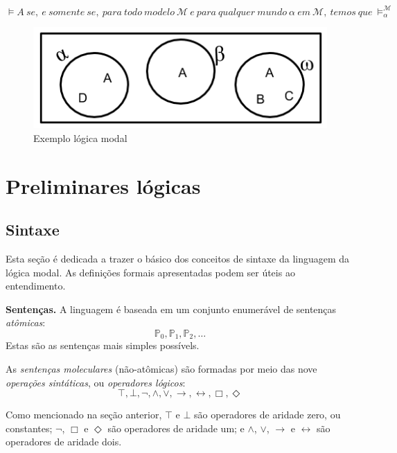 \begin{equation}
    \models A\ se,\ e\ somente\ se,\ para\ todo\ modelo\ \mathcal{M}\ e\ para\ 
    qualquer\ mundo\ \alpha\ em\ \mathcal{M},\ temos\ que\ \models ^{\mathcal{M}}_\alpha 
\end{equation}



\begin{figure}
\label{figure:mundos_simples}
\begin{center}
\includegraphics[scale=0.8]{imagens/ex_modal_simples.png}
\caption{Exemplo lógica modal}
\end{center}
\end{figure}

\section{Preliminares lógicas}
\subsection{Sintaxe}

Esta seção é dedicada a trazer o básico dos conceitos de sintaxe da linguagem da
lógica modal. As definições formais apresentadas podem ser úteis ao
entendimento.

\textbf{Sentenças.} A linguagem é baseada em um conjunto enumerável de sentenças
\textit{at\^omicas}: 
\begin{equation}
    \mathbb{P}_0, \mathbb{P}_1, \mathbb{P}_2, \ldots 
\end{equation}
Estas são as sentenças mais simples possívels.

As \textit{sentenças moleculares} (não-at\^omicas) são formadas por meio das nove
\textit{operações sintáticas}, ou \textit{operadores lógicos}:
\begin{equation}
   \top, \bot, \neg, \wedge, \vee, \rightarrow, \leftrightarrow, \Box, \Diamond
\end{equation}

Como mencionado na seção anterior, $\top$ e $\bot$ são operadores de aridade
zero, ou constantes; $\neg$, $\Box$ e $\Diamond$ são operadores de aridade um; e
$\wedge$, $\vee$, $\rightarrow$ e $\leftrightarrow$ são operadores de aridade
dois.

